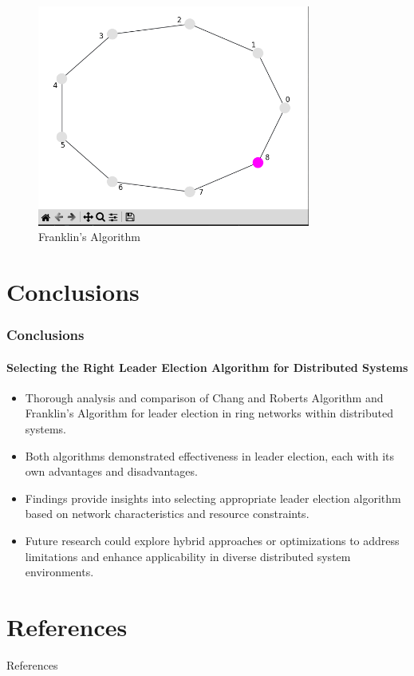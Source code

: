 \documentclass[11pt]{beamer}              %
\begin{document}
\begin{frame}
\begin{figure}
    \centering
    \includegraphics[width=0.8\textwidth]{figures/algo4f.png}
    \caption{Franklin's Algorithm}
\end{figure}
\end{frame}

\section{Conclusions}
\begin{frame}
\frametitle{Conclusions}
\framesubtitle{Selecting the Right Leader Election Algorithm for Distributed Systems}
\begin{itemize}
    \item Thorough analysis and comparison of Chang and Roberts Algorithm and Franklin’s Algorithm for leader election in ring networks within distributed systems.
    \item Both algorithms demonstrated effectiveness in leader election, each with its own advantages and disadvantages.
    \item Findings provide insights into selecting appropriate leader election algorithm based on network characteristics and resource constraints.
    \item Future research could explore hybrid approaches or optimizations to address limitations and enhance applicability in diverse distributed system environments.
\end{itemize}

\end{frame}

\section*{References}
\begin{frame}{References}


\nocite{*} %
\end{frame}


\thankslide
\end{document}
